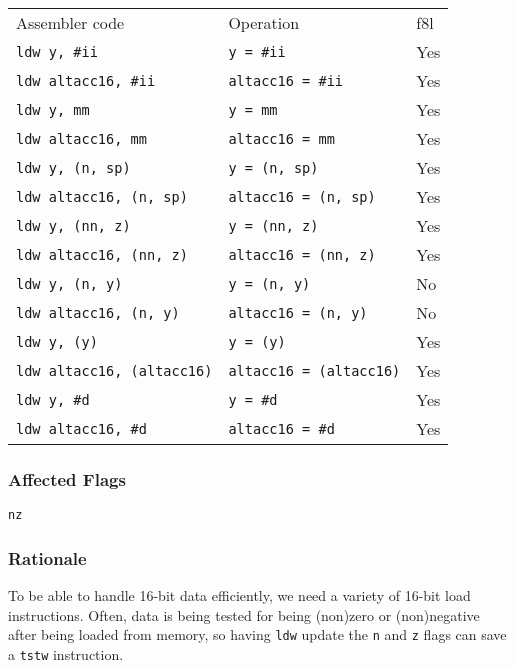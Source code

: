 \documentclass{book}
\begin{document}
\begin{tabular}{l l l}
Assembler code                    & Operation                      & f8l \\
\texttt{ldw y, \#ii}              & \texttt{y = \#ii}              & Yes \\
\texttt{ldw altacc16, \#ii}       & \texttt{altacc16 = \#ii}       & Yes \\
\texttt{ldw y, mm}                & \texttt{y = mm}                & Yes \\
\texttt{ldw altacc16, mm}         & \texttt{altacc16 = mm}         & Yes \\
\texttt{ldw y, (n, sp)}           & \texttt{y = (n, sp)}           & Yes \\
\texttt{ldw altacc16, (n, sp)}    & \texttt{altacc16 = (n, sp)}    & Yes \\
\texttt{ldw y, (nn, z)}           & \texttt{y = (nn, z)}           & Yes \\
\texttt{ldw altacc16, (nn, z)}    & \texttt{altacc16 = (nn, z)}    & Yes \\
\texttt{ldw y, (n, y)}            & \texttt{y = (n, y)}            & No \\
\texttt{ldw altacc16, (n, y)}     & \texttt{altacc16 = (n, y)}     & No \\
\texttt{ldw y, (y)}               & \texttt{y = (y)}               & Yes \\
\texttt{ldw altacc16, (altacc16)} & \texttt{altacc16 = (altacc16)} & Yes \\
\texttt{ldw y, \#d}               & \texttt{y = \#d}               & Yes \\
\texttt{ldw altacc16, \#d}        & \texttt{altacc16 = \#d}        & Yes \\
\end{tabular}

\subsubsection*{Affected Flags}

\texttt{nz}

\subsubsection*{Rationale}

To be able to handle 16-bit data efficiently, we need a variety of 16-bit load instructions. Often, data is being tested for being (non)zero or (non)negative after being loaded from memory, so having \texttt{ldw} update the \texttt{n} and \texttt{z} flags can save a \texttt{tstw} instruction.
\end{document}
